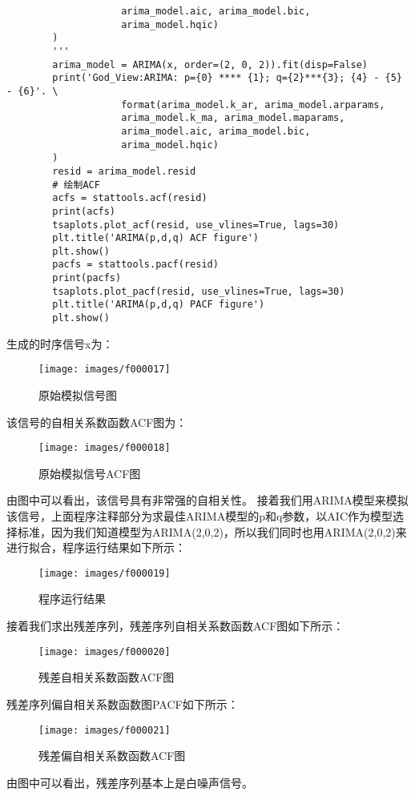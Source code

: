 \begin{lstlisting}
                    arima_model.aic, arima_model.bic, 
                    arima_model.hqic)
        )
        '''
        arima_model = ARIMA(x, order=(2, 0, 2)).fit(disp=False)
        print('God_View:ARIMA: p={0} **** {1}; q={2}***{3}; {4} - {5} - {6}'. \
                    format(arima_model.k_ar, arima_model.arparams, 
                    arima_model.k_ma, arima_model.maparams, 
                    arima_model.aic, arima_model.bic, 
                    arima_model.hqic)
        )
        resid = arima_model.resid
        # 绘制ACF
        acfs = stattools.acf(resid)
        print(acfs)
        tsaplots.plot_acf(resid, use_vlines=True, lags=30)
        plt.title('ARIMA(p,d,q) ACF figure')
        plt.show()
        pacfs = stattools.pacf(resid)
        print(pacfs)
        tsaplots.plot_pacf(resid, use_vlines=True, lags=30)
        plt.title('ARIMA(p,d,q) PACF figure')
        plt.show()
\end{lstlisting}
生成的时序信号x为：
\begin{figure}[H]
	\caption{原始模拟信号图}
	\label{f000017}
	\centering
	\texttt{[image: images/f000017]}
\end{figure}
该信号的自相关系数函数ACF图为：
\begin{figure}[H]
	\caption{原始模拟信号ACF图}
	\label{f000018}
	\centering
	\texttt{[image: images/f000018]}
\end{figure}
由图中可以看出，该信号具有非常强的自相关性。\newline
接着我们用ARIMA模型来模拟该信号，上面程序注释部分为求最佳ARIMA模型的p和q参数，以AIC作为模型选择标准，因为我们知道模型为ARIMA(2,0,2)，所以我们同时也用ARIMA(2,0,2)来进行拟合，程序运行结果如下所示：
\begin{figure}[H]
	\caption{程序运行结果}
	\label{f000019}
	\centering
	\texttt{[image: images/f000019]}
\end{figure}
接着我们求出残差序列，残差序列自相关系数函数ACF图如下所示：
\begin{figure}[H]
	\caption{残差自相关系数函数ACF图}
	\label{f000020}
	\centering
	\texttt{[image: images/f000020]}
\end{figure}
残差序列偏自相关系数函数图PACF如下所示：
\begin{figure}[H]
	\caption{残差偏自相关系数函数ACF图}
	\label{f000021}
	\centering
	\texttt{[image: images/f000021]}
\end{figure}
由图中可以看出，残差序列基本上是白噪声信号。
